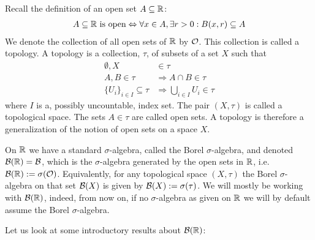 \documentclass[../../textbook.tex]{subfiles}
\begin{document}
Recall the definition of an open set $A\subseteq \mathbb{R}$:
\begin{align*}
    A\subseteq \mathbb{R} \text{ is open} \Leftrightarrow \forall x \in A, \exists r > 0: B(x, r) \subseteq A
\end{align*}
We denote the collection of all open sets of $\mathbb{R}$ by $\mathcal{O}$. This collection is called a topology. A topology is a collection, $\tau$, of subsets of a set $X$ such that
\begin{align*}
    \emptyset, X &\in \tau \\
    A, B \in \tau &\Rightarrow A \cap B \in \tau \\
    \{U_i\}_{i \in I} \subseteq \tau &\Rightarrow \bigcup_{i \in I}U_i \in \tau
\end{align*}
where $I$ is a, possibly uncountable, index set. The pair $(X, \tau)$ is called a topological space. The sets $A\in \tau$ are called open sets. A topology is therefore a generalization of the notion of open sets on a space $X$.

On $\mathbb{R}$ we have a standard $\sigma$-algebra, called the Borel $\sigma$-algebra, and denoted $\mathcal{B}(\mathbb{R})=\mathcal{B}$, which is the $\sigma$-algebra generated by the open sets in $\mathbb{R}$, i.e. $\mathcal{B}(\mathbb{R}):=\sigma(\mathcal{O})$. Equivalently, for any topological space $(X, \tau)$ the Borel $\sigma$-algebra on that set $\mathcal{B}(X)$ is given by $\mathcal{B}(X):=\sigma(\tau)$. We will mostly be working with $\mathcal{B}(\mathbb{R})$, indeed, from now on, if no $\sigma$-algebra as given on $\mathbb{R}$ we will by default assume the Borel $\sigma$-algebra.


Let us look at some introductory results about $\mathcal{B}(\mathbb{R})$:
\end{document}

